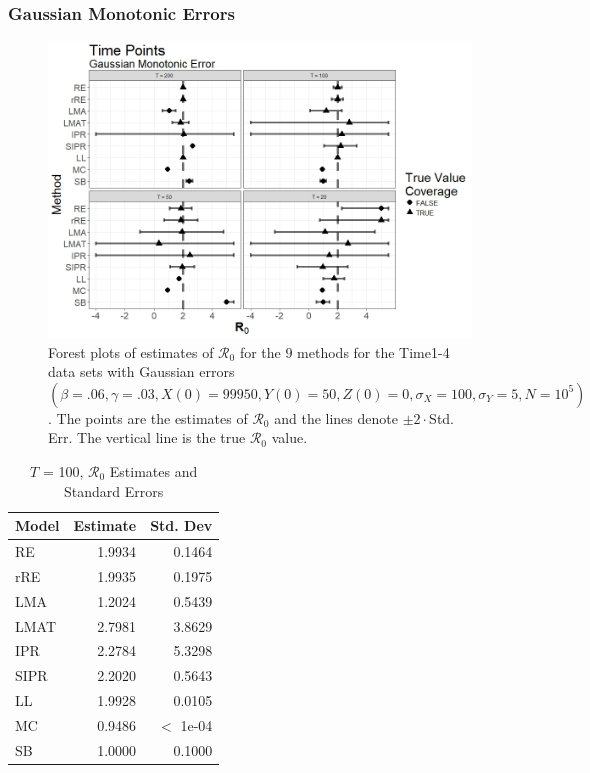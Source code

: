 \documentclass[12pt]{article}
\newcommand{\xxsir}{\ensuremath{9} } %
\newcommand{\rr}{\ensuremath{\mathcal{R}_0}}
\begin{document}
\subsubsection{Gaussian Monotonic Errors}
\begin{figure}[H]
	\centering
	\includegraphics[scale=0.5]{images/time_nm.jpeg}
	\caption{Forest plots of estimates of $\rr$ for the \xxsir methods for the Time1-4 data sets with Gaussian errors $(\beta=.06, \gamma=.03, X(0)=99950, Y(0)=50, Z(0)=0, \sigma_X=100, \sigma_Y=5, N=10^5)$.  The points are the estimates of $\rr$ and the lines denote $\pm 2\cdot $Std. Err.  The vertical line is the true $\rr$ value.}
\end{figure}

\begin{table}[H]
	
	
	\centering
	\begin{tabular}[t]{l|r|r}
		\hline
		Model & Estimate & Std. Dev\\
		\hline
		RE & 1.9934 & 0.1464\\
		\hline
		rRE & 1.9935 & 0.1975\\
		\hline
		LMA & 1.2024 & 0.5439\\
		\hline
		LMAT & 2.7981 & 3.8629\\
		\hline
		IPR & 2.2784 & 5.3298\\
		\hline
		SIPR & 2.2020 & 0.5643\\
		\hline
		LL & 1.9928 & 0.0105\\
		\hline
		MC & 0.9486 & $<$ 1e-04\\
		\hline
		SB & 1.0000 & 0.1000\\
		\hline
	\end{tabular}
	\caption{ $T$ = 100, $\rr$ Estimates and Standard Errors}
\end{table}
\end{document}
